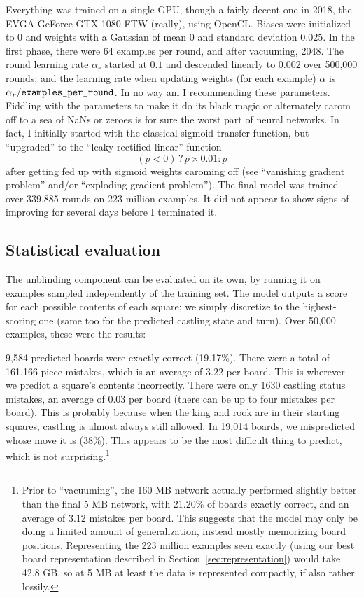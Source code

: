 \documentclass[twocolumn]{amsart}
\begin{document}
Everything was trained on a single GPU, though a fairly decent one in
2018, the EVGA GeForce GTX 1080 FTW (really), using OpenCL. Biases
were initialized to $0$ and weights with a Gaussian of mean $0$ and
standard deviation $0.025$. In the first phase, there were 64 examples
per round, and after vacuuming, 2048. The round learning rate
$\alpha_r$ started at $0.1$ and descended linearly to $0.002$ over
500,000 rounds; and the learning rate when updating weights (for each
example) $\alpha$ is $\alpha_r / \verb+examples_per_round+$. In no way
am I recommending these parameters. Fiddling with the parameters to
make it do its black magic or alternately carom off to a sea of NaNs
or zeroes is for sure the worst part of neural networks. In fact, I
initially started with the classical sigmoid transfer function, but
``upgraded'' to the ``leaky rectified linear'' function
%
$$(p < 0) \,?\, p \times 0.01 : p$$
%
after getting fed up with sigmoid weights caroming off (see
``vanishing gradient problem'' and/or ``exploding gradient problem'').
The final model was trained over 339,885 rounds on 223 million
examples. It did not appear to show signs of improving for
several days before I terminated it.

\subsection{Statistical evaluation}

The unblinding component can be evaluated on its own, by running it on
examples sampled independently of the training set. The model outputs
a score for each possible contents of each square; we simply
discretize to the highest-scoring one (same too for the predicted
castling state and turn). Over 50,000 examples, these were the
results:

9,584 predicted boards were exactly correct (19.17\%). There were a
total of 161,166 piece mistakes, which is an average of 3.22 per
board. This is wherever we predict a square's contents incorrectly.
There were only 1630 castling status mistakes, an average of 0.03 per
board (there can be up to four mistakes per board). This is probably
because when the king and rook are in their starting squares, castling
is almost always still allowed. In 19,014 boards, we mispredicted
whose move it is (38\%). This appears to be the most difficult thing
to predict, which is not surprising.\footnote{ Prior to ``vacuuming'',
  the 160 MB network actually performed slightly better than the final
  5 MB network, with 21.20\% of boards exactly correct, and an average
  of 3.12 mistakes per board. This suggests that the model may only be
  doing a limited amount of generalization, instead mostly memorizing
  board positions. Representing the 223 million examples seen exactly
  (using our best board representation described in
  Section~\ref{sec:representation}) would take 42.8 GB, so at 5 MB at
  least the data is represented compactly, if also rather lossily.}
\end{document}
